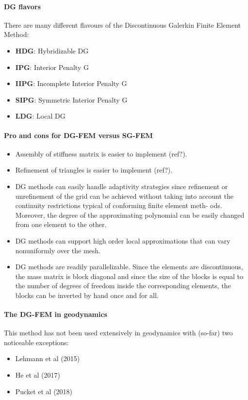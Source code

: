 \paragraph{DG flavors}
There are many different flavours of the Discontinuous Galerkin Finite Element Method:
\begin{itemize}
\item {\bf HDG}: Hybridizable DG \cite{cogo09,conp10,ngpc10,ngpc11,ngpe12}
\item {\bf IPG}: Interior Penalty G  \cite{mofh08,mofp10}
\item {\bf IIPG}: Incomplete Interior Penalty G  \cite{dole08}
\item {\bf SIPG}: Symmetric Interior Penalty G  \cite{bodi11,sclu17a}
\item {\bf LDG}: Local DG \cite{cacp02,coks02,cacs05,coks05}  
\end{itemize}

\paragraph{Pro and cons for DG-FEM versus SG-FEM}

\begin{itemize}
\item Assembly of stiffness matrix is easier to implement (ref?).
\item Refinement of triangles is easier to implement (ref?). 
\item DG methods can easily handle adaptivity strategies since refinement or
unrefinement of the grid can be achieved without taking into account
the continuity restrictions typical of conforming finite element meth-
ods. Moreover, the degree of the approximating polynomial can be easily
changed from one element to the other. \cite{coks00}
\item DG methods can support high order local approximations that can vary nonuniformly over the mesh.
\item DG methods are readily parallelizable. Since the elements are discontinuous, 
the mass matrix is block diagonal and since the size of the blocks
is equal to the number of degrees of freedom inside the corresponding
elements, the blocks can be inverted by hand once and for all.\cite{coks00}
\end{itemize}

\paragraph{The DG-FEM in geodynamics} 
This method has not been used extensively in geodynamics with (so-far) two 
noticeable exceptions:

\begin{itemize}
\item Lehmann et al (2015) \cite{lelk15} 
\item He et al (2017) \cite{hepb17}
\item Pucket et al (2018) \cite{puth18}
\end{itemize}


